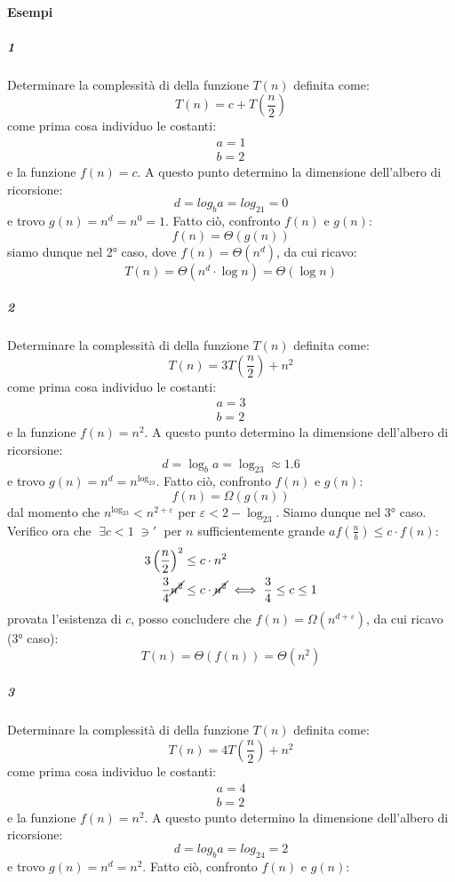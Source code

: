 \documentclass[italian]{article}
\newcommand{\taleche}{\;\ni'\;}
\newcommand{\fn}{f(n)}
\newcommand{\gn}{g(n)}
\let\oldexists\exists
\renewcommand{\exists}{\text{$\;\oldexists$}}
\newcommand{\example}{\text{\faCircleArrowRight $\;$ Esempio }}
\begin{document}
\paragraph{Esempi}
\subparagraph{\example 1} Determinare la complessità di della funzione $T(n)$ definita come:
\[
	T(n) = c + T\left(\frac{n}{2}\right)
\]
come prima cosa individuo le costanti:
\begin{gather*}
	a = 1 \\
	b = 2
\end{gather*}
e la funzione $\fn = c$. A questo punto determino la dimensione dell'albero di ricorsione:
\[
	d = {log_ba} = log_21 = 0
\]
e trovo $\gn = n^d = n^0 = 1$. Fatto ciò, confronto $\fn$ e $\gn$:
\[
	\fn = \varTheta(\gn)
\]
siamo dunque nel 2° caso, dove $\fn = \varTheta(n^d)$, da cui ricavo:
\[
	T(n) = \varTheta(n^d\cdot \log n) = \varTheta(\log n)
\]
\subparagraph{\example 2} Determinare la complessità di della funzione $T(n)$ definita come:
\[
	T(n) = 3T\left(\frac{n}{2}\right) + n^2
\]
come prima cosa individuo le costanti:
\begin{gather*}
	a = 3 \\
	b = 2
\end{gather*}
e la funzione $\fn = n^2$. A questo punto determino la dimensione dell'albero di ricorsione:
\[
	d = {\log_ba} = \log_23 \approx 1.6
\]
e trovo $\gn = n^d = n^{\log_23}$. Fatto ciò, confronto $\fn$ e $\gn$:
\[
	\fn = \varOmega(\gn)
\]
dal momento che $n^{\log_23} < n^{2+\varepsilon}$ per $\varepsilon < 2 -\log_23$. Siamo dunque nel 3° caso. Verifico ora che $\exists c < 1 \taleche$ per $n$ sufficientemente grande $af(\frac{n}{b}) \leq c\cdot \fn$:
\begin{align*}
	3\left( \frac{n}{2} \right)^2 &\leq c\cdot n^2 \\
	\frac{3}{4}\cancel{n^2} &\leq c\cdot \cancel{n^2} \iff \frac{3}{4} \leq c \leq 1
\end{align*}
provata l'esistenza di $c$, posso concludere che $\fn = \varOmega(n^{d+\varepsilon})$, da cui ricavo (3° caso):
\[
	T(n) = \varTheta(\fn) = \varTheta(n^2)
\]
\subparagraph{\example 3} Determinare la complessità di della funzione $T(n)$ definita come:
\[
	T(n) = 4T\left(\frac{n}{2}\right) + n^2
\]
come prima cosa individuo le costanti:
\begin{gather*}
	a = 4 \\
	b = 2
\end{gather*}
e la funzione $\fn = n^2$. A questo punto determino la dimensione dell'albero di ricorsione:
\[
	d = {log_ba} = log_24 = 2
\]
e trovo $\gn = n^d = n^2$. Fatto ciò, confronto $\fn$ e $\gn$:
\end{document}
